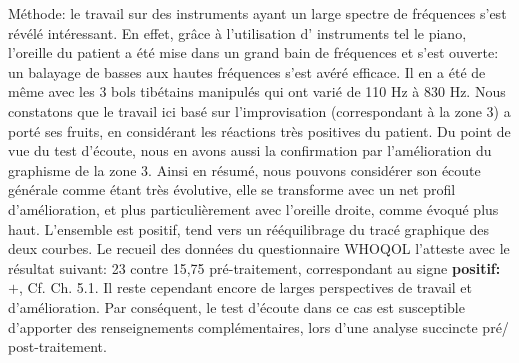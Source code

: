  Méthode:  le travail sur des instruments ayant un large spectre de fréquences s'est révélé intéressant. 
 En effet, 
 grâce à l'utilisation d' instruments tel le piano,  l'oreille du patient a été mise dans un grand bain de 
 fréquences 
 et  s'est ouverte: un balayage 
 de  basses aux hautes fréquences s'est avéré efficace. Il en a été de même avec les 3 bols tibétains 
 manipulés 
 qui ont varié de 110 Hz à 830 Hz.
 Nous constatons que le travail ici  basé sur l'improvisation (correspondant à la zone 3) a porté ses fruits, 
 en considérant les 
 réactions très positives du patient. 
 Du point de vue du test d'écoute, nous en avons aussi  la confirmation par l'amélioration du  graphisme 
 de la zone 3.
Ainsi en résumé, nous pouvons considérer son écoute générale comme étant très évolutive, elle se 
transforme avec un net profil 
d'amélioration, et 
plus particulièrement avec l'oreille
droite, comme évoqué plus haut. L'ensemble est positif, tend vers un
rééquilibrage du tracé graphique des deux courbes. Le recueil des données du
questionnaire WHOQOL l'atteste avec le résultat suivant: 23 contre 15,75 pré-traitement, correspondant
au signe \textbf{positif: $+$}, Cf. Ch. 5.1.
Il reste cependant encore de larges perspectives de travail et d'amélioration.
Par conséquent, le test d'écoute dans ce cas est susceptible d'apporter des renseignements 
complémentaires, lors
d'une analyse succincte pré/ post-traitement.


